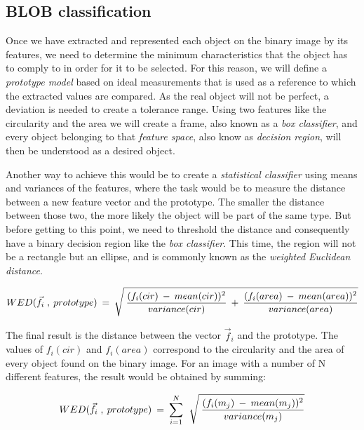 
\subsection{BLOB classification}
Once we have extracted and represented each object on the binary image by its features, we need to determine the minimum characteristics that the object has to comply to in order for it to be selected.
For this reason, we will define a \textit{prototype model} based on ideal measurements that is used as a reference to which the extracted values are compared. As the real object will not be perfect, a deviation is needed to create a tolerance range.
Using two features like the circularity and the area we will create a frame, also known as a \textit{box classifier}, and every object belonging to that \textit{feature space}, also know as \textit{decision region}, will then be understood as a desired object.

Another way to achieve this would be to create a \textit{statistical classifier} using means and variances of the features, where the task would be to measure the distance between a new feature vector and the prototype. The smaller the distance between those two, the more likely the object will be part of the same type. But before getting to this point, we need to threshold the distance and consequently have a binary decision region like the \textit{box classifier}.
This time, the region will not be a rectangle but an ellipse, and is commonly known as the \textit{weighted Euclidean distance}.

\begin{equation}	
	\begin{aligned}
{WED(\vec{f}_{i} \; , \: prototype)} \: = \: \sqrt{\mathstrut \:  \displaystyle\frac{(f_{i}(cir) \: - \: mean(cir))^2}{variance(cir)} \: + \: \displaystyle\frac{(f_{i}(area) \: - \: mean(area))^2}{variance(area)}}
\label{Euclidean}
	\end{aligned}
\end{equation}

The final result is the distance between the vector {$\vec{f}_{i}$} and the prototype. The values of {$f_{i}(cir)$} and {$f_{i}(area)$} correspond to the circularity and the area of every object found on the binary image. For an image with a number of N different features, the result would be obtained by summing:


\begin{equation}	
	\begin{aligned}
{WED(\vec{f}_{i} \; , \: prototype)} \: = \: \displaystyle\sum_{i=1}^N \: \: \sqrt{\mathstrut \:  \displaystyle\frac{(f_{i}(m_{j}) \: - \: mean(m_{j}))^2}{variance(m_{j})}}
\label{Euclidean1}
	\end{aligned}
\end{equation}

